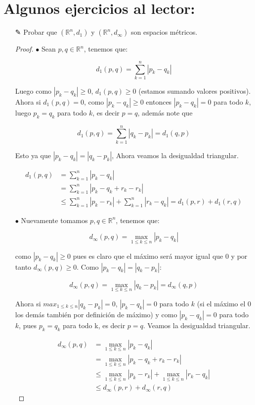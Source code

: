 \section{Algunos ejercicios al lector: }

\begin{itemize}
    \item [✎] Probar que $(\mathbb{R}^n,d_1)$ y $(\mathbb{R}^n,d_{\infty})$ son espacios métricos.\\

    \begin{proof}
        $\bullet$ Sean $p,q \in \mathbb{R}^n$, tenemos que:

        $$d_1(p,q)=\sum_{k=1}^n|p_k-q_k|$$

        Luego como $|p_k-q_k|\geq 0 $, $d_1(p,q)\geq 0$ (estamos sumando valores positivos). Ahora si $d_1(p,q)=0$, como $|p_k-q_k|\geq 0$ entonces $|p_k-q_k|=0$ para todo $k$, luego $p_k=q_k$ para todo $k$, es decir $p=q$, además note que 

        $$d_1(p,q)=\sum_{k=1}^n|q_k-p_k|=d_1(q,p)$$

        Esto ya que $|p_k-q_k|=|q_k-p_k|$, Ahora veamos la desigualdad triangular.

            \begin{align*}
                d_1(p,q)&=\sum_{k=1}^n|p_k-q_k|\\
                &=\sum_{k=1}^n|p_k-q_k+r_k-r_k|\\
                &\leq \sum_{k=1}^n|p_k-r_k|+\sum_{k=1}^n|r_k-q_k|=d_1(p,r)+d_1(r,q)
            \end{align*}
            
            $\bullet$ Nuevamente tomamos $p,q \in \mathbb{R}^n$, tenemos que:

        $$d_{\infty}(p,q)=\max_{1\leq k\leq n}|p_k-q_k|$$

        como $|p_k-q_k|\geq 0$ pues es claro que el máximo será mayor igual que 0 y por tanto $d_{\infty}(p,q)\geq 0$. Como $|p_k-q_k|=|q_k-p_k|$:

         $$d_{\infty}(p,q)=\max_{1\leq k\leq n}|q_k-p_k|=d_{\infty}(q,p)$$

         Ahora si $max_{1\leq k \leq n} |q_k-p_k|=0$, $|p_k-q_k|=0$ para todo $k$ (si el máximo el 0 los demás también por definición de máximo) y como $|p_k-q_k|=0$ para todo $k$, pues $p_k=q_k$ para todo k, es decir $p=q$. Veamos la desigualdad triangular.

            \begin{align*}
                d_{\infty}(p,q)&=\max_{1\leq k\leq n}|p_k-q_k|\\
                &=\max_{1\leq k\leq n}|p_k-q_k+r_k-r_k|\\
                &\leq \max_{1\leq k\leq n}|p_k-r_k|+\max_{1\leq k\leq n}|r_k-q_k|\\
                &\leq d_{\infty}(p,r)+d_{\infty}(r,q)
            \end{align*}
        

\end{proof}
\end{itemize}
